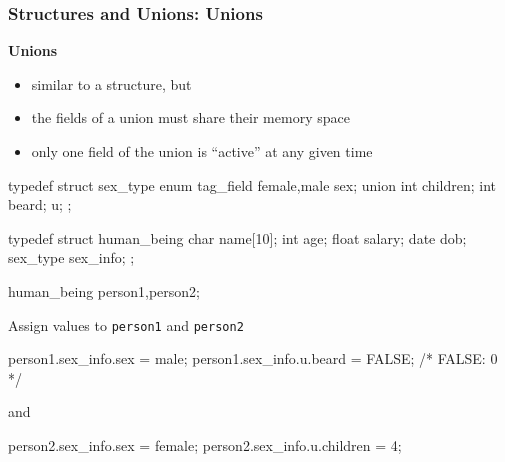 \documentclass[newPxFont,sthlmFooter,nooffset]{beamer}
\begin{document}
\begin{frame}
  \frametitle{Structures and Unions: Unions}
\textbf{Unions}
\begin{itemize}
\item similar to a structure, but
\item the fields of a union must share their memory space
\item only one field of the union is ``active'' at any given time
\end{itemize}

\framebreak


\begin{codedef}
typedef struct sex_type {
    enum tag_field {female,male} sex; 
    union {
        int children;
        int beard; } u;
};

typedef struct human_being {
    char name[10]; 
    int age;
    float salary; 
    date dob; 
    sex_type sex_info;
};

human_being person1,person2;    
\end{codedef}

\framebreak


Assign values to \texttt{person1} and \texttt{person2}
\begin{codedef}
person1.sex_info.sex = male; 
person1.sex_info.u.beard = FALSE; /* FALSE: 0 */
\end{codedef}

and

\begin{codedef}
person2.sex_info.sex = female; 
person2.sex_info.u.children = 4;
\end{codedef}
\end{frame}
\end{document}

